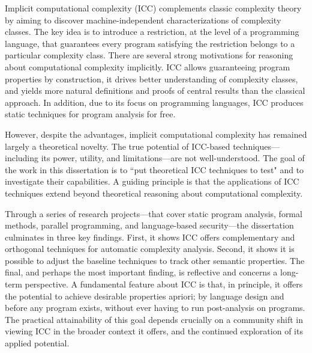 Implicit computational complexity (ICC) complements classic complexity theory by
aiming to discover machine-independent characterizations of complexity classes.
The key idea is to introduce a restriction, at the level of a programming
language, that guarantees every program satisfying the restriction belongs to a
particular complexity class. There are several strong motivations for reasoning
about computational complexity implicitly. ICC allows guaranteeing program
properties by construction, it drives better understanding of complexity
classes, and yields more natural definitions and proofs of central results than
the classical approach. In addition, due to its focus on programming languages,
ICC produces static techniques for program analysis for free.

However, despite the advantages, implicit computational complexity has remained
largely a theoretical novelty. The true potential of ICC-based
techniques---including its power, utility, and limitations---are not
well-understood. The goal of the work in this dissertation is to ``put
theoretical ICC techniques to test" and to investigate their capabilities. A
guiding principle is that the applications of ICC techniques extend beyond
theoretical reasoning about computational complexity.

Through a series of research projects---that cover static program analysis,
formal methods, parallel programming, and language-based security---the
dissertation culminates in three key findings. First, it shows ICC offers
complementary and orthogonal techniques for automatic complexity analysis.
Second, it shows it is possible to adjust the baseline techniques to track other
semantic properties. The final, and perhaps the most important finding, is
reflective and concerns a long-term perspective. A fundamental feature about ICC
is that, in principle, it offers the potential to achieve desirable properties
apriori; by language design and before any program exists, without ever having
to run post-analysis on programs. The practical attainability of this goal
depends crucially on a community shift in viewing ICC in the broader context it
offers, and the continued exploration of its applied potential.